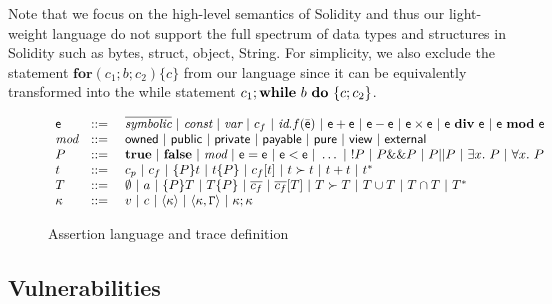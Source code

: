 Note that we focus on the high-level semantics of Solidity and thus our light-weight language do not support the full spectrum of data types and structures in Solidity such as bytes, struct, object, String. For simplicity, we also exclude the statement $\textbf{for}(c_1;b;c_2)\{c\}$ from our language since it can be equivalently transformed into the while statement $c_1;\textbf{while}~b~\textbf{do}~\{c;c_2\}$.
\begin{figure}
$
\begin{array}{lcl}
\mathsf{e}&::=~&\overline{\textit{symbolic}}~|~\textit{const}~|~\textit{var}~|~c_f~|~\textit{id}.f(\bar{\textsf{e}})~|~\mathsf{e} + \mathsf{e}~|~ \mathsf{e} - \mathsf{e}~|~ \mathsf{e} \times \mathsf{e} ~|~ \mathsf{e}~\textbf{div}~\mathsf{e}~|~ \mathsf{e}~\textbf{mod}~\mathsf{e}\\
\textit{mod}&::=~&\textsf{owned}~|~ \textsf{public}~|~\textsf{private}~|~\textsf{payable}~|~\textsf{pure}~|~\textsf{view}~|~\textsf{external}\\
P&::=~&\textbf{true}~|~\textbf{false}~|~\textit{mod}~|~ \mathsf{e} = \mathsf{e}~|~ \mathsf{e} < \mathsf{e}~|~\ldots~|~!P~|~P \&\& P ~|~ P || P ~|~ \exists x.~P~|~ \forall x.~P\\
t&::=~&c_{p}~|~c_f~|~\{P\}t~|~t\{P\}~|~c_f[t]~|~t \succ t~|~t+t~|~t^*\\
T&::=~&\emptyset~|~a~|~\{P\}T~|~T\{P\}~|~\overline{c_f}~|~\overline{c_f}[T]~|~T \succ T~|~T\cup T~|~T \cap T ~|~T^*\\
\kappa&::=~&v~|~c~|~\langle \kappa \rangle~|~\langle \kappa,\mathtt{\Gamma} \rangle~|~\kappa ; \kappa
\end{array}
$
\caption{Assertion language and trace definition}\label{fig:assert}
\end{figure}

\subsection{Vulnerabilities}


